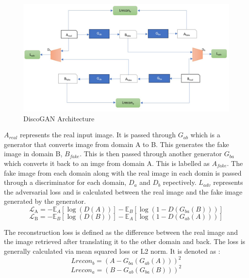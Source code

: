 \documentclass[12pt,a4paper]{article}
\begin{document}
\begin{figure}[!h]
  \centering
\includegraphics[scale = 0.5]{discoGAN}
  \caption{DiscoGAN Architecture}
  \label{fig:DiscoGAN}
\end{figure}

$A_{real}$ represents the real input image. It is passed through $G_{ab}$ which is a generator that converts image from domain A to B. This generates the fake image in domain B, $B_{fake}$. This is then passed through another generator $G_{ba}$ which converts it back to an imge from domain A.
This is labelled as $A_{fake}$. The fake image from each domain along with the real image in each domin is passed through a discriminator for each domain, $D_a$ and $D_b$ repectively. $L_{adv}$ represents the adversarial loss and is calculated between the real image and the fake image generated by the generator. 
\begin{equation}
\mathcal{L}_{\text{A}} = -\mathbb{E}_{A}[\log(D(A))] - \mathbb{E}_{B}[\log(1 - D(G_{ba}(B)))]
\end{equation}
\begin{equation}
\mathcal{L}_{\text{B}} = -\mathbb{E}_{B}[\log(D(B))] - \mathbb{E}_{A}[\log(1 - D(G_{ab}(A)))]
\end{equation}

The reconstruction loss is defined as the difference between the real image and the image retrieved after translating it to the other domain and back. The loss is generally calculated via mean squared loss or L2 norm. It is denoted as :
\newline
\begin{equation}
Lrecon_{b} = (A - G_{ba}(G_{ab}(A)))^{2}
\end{equation}
\begin{equation}
Lrecon_{a} = (B - G_{ab}(G_{ba}(B)))^{2}
\end{equation}
\end{document}

